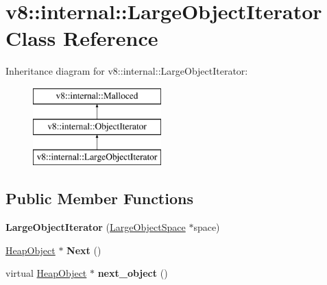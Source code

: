 \hypertarget{classv8_1_1internal_1_1_large_object_iterator}{}\section{v8\+:\+:internal\+:\+:Large\+Object\+Iterator Class Reference}
\label{classv8_1_1internal_1_1_large_object_iterator}
Inheritance diagram for v8\+:\+:internal\+:\+:Large\+Object\+Iterator\+:\begin{figure}[H]
\begin{center}
\leavevmode
\includegraphics[height=3.000000cm]{classv8_1_1internal_1_1_large_object_iterator}
\end{center}
\end{figure}
\subsection*{Public Member Functions}
\begin{DoxyCompactItemize}
\item 
{\bfseries Large\+Object\+Iterator} (\hyperlink{classv8_1_1internal_1_1_large_object_space}{Large\+Object\+Space} $\ast$space)\hypertarget{classv8_1_1internal_1_1_large_object_iterator_ab14565d56a9d243c94e7d9b86f5862aa}{}\label{classv8_1_1internal_1_1_large_object_iterator_ab14565d56a9d243c94e7d9b86f5862aa}

\item 
\hyperlink{classv8_1_1internal_1_1_heap_object}{Heap\+Object} $\ast$ {\bfseries Next} ()\hypertarget{classv8_1_1internal_1_1_large_object_iterator_a66f8be9d006f95a2db1113d03be859eb}{}\label{classv8_1_1internal_1_1_large_object_iterator_a66f8be9d006f95a2db1113d03be859eb}

\item 
virtual \hyperlink{classv8_1_1internal_1_1_heap_object}{Heap\+Object} $\ast$ {\bfseries next\+\_\+object} ()\hypertarget{classv8_1_1internal_1_1_large_object_iterator_a8a772a4a789f798953d3427f54d1d558}{}\label{classv8_1_1internal_1_1_large_object_iterator_a8a772a4a789f798953d3427f54d1d558}

\end{DoxyCompactItemize}

